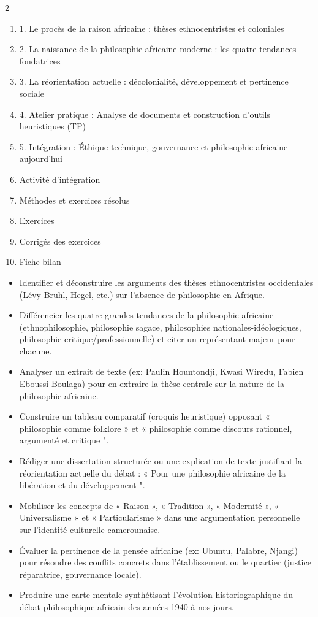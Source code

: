 \documentclass[11pt]{article}
\begin{document}
\begin{sommaire}
\begin{multicols}{2}
\begin{enumerate}
\item 1. Le procès de la raison africaine : thèses ethnocentristes et coloniales
\item 2. La naissance de la philosophie africaine moderne : les quatre tendances fondatrices
\item 3. La réorientation actuelle : décolonialité, développement et pertinence sociale
\item 4. Atelier pratique : Analyse de documents et construction d'outils heuristiques (TP)
\item 5. Intégration : Éthique technique, gouvernance et philosophie africaine aujourd'hui
\item Activité d'intégration
\item Méthodes et exercices résolus
\item Exercices
\item Corrigés des exercices
\item Fiche bilan
\end{enumerate}
\end{multicols}
\end{sommaire}

\begin{objectifs}
\begin{itemize}
\item Identifier et déconstruire les arguments des thèses ethnocentristes occidentales (Lévy-Bruhl, Hegel, etc.) sur l'absence de philosophie en Afrique.
\item Différencier les quatre grandes tendances de la philosophie africaine (ethnophilosophie, philosophie sagace, philosophies nationales-idéologiques, philosophie critique/professionnelle) et citer un représentant majeur pour chacune.
\item Analyser un extrait de texte (ex: Paulin Hountondji, Kwasi Wiredu, Fabien Eboussi Boulaga) pour en extraire la thèse centrale sur la nature de la philosophie africaine.
\item Construire un tableau comparatif (croquis heuristique) opposant « philosophie comme folklore » et « philosophie comme discours rationnel, argumenté et critique ".
\item Rédiger une dissertation structurée ou une explication de texte justifiant la réorientation actuelle du débat : « Pour une philosophie africaine de la libération et du développement ".
\item Mobiliser les concepts de « Raison », « Tradition », « Modernité », « Universalisme » et « Particularisme » dans une argumentation personnelle sur l'identité culturelle camerounaise.
\item Évaluer la pertinence de la pensée africaine (ex: Ubuntu, Palabre, Njangi) pour résoudre des conflits concrets dans l'établissement ou le quartier (justice réparatrice, gouvernance locale).
\item Produire une carte mentale synthétisant l'évolution historiographique du débat philosophique africain des années 1940 à nos jours.
\end{itemize}
\end{objectifs}
\end{document}
